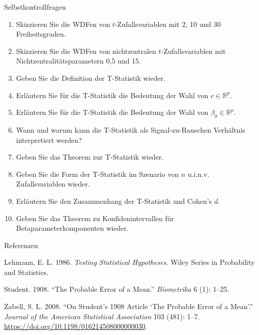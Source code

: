 \documentclass[
  8pt,
  ignorenonframetext,
]{beamer}
\providecommand{\tightlist}{%
  \setlength{\itemsep}{0pt}\setlength{\parskip}{0pt}}
\newlength{\cslhangindent}
\newlength{\cslentryspacingunit} %
\newenvironment{CSLReferences}[2] %
 {%
  \setlength{\parindent}{0pt}
  \ifodd #1
  \let\oldpar\par
  \def\par{\hangindent=\cslhangindent\oldpar}
  \fi
  \setlength{\parskip}{#2\cslentryspacingunit}
 }%
 {}
\begin{document}
\begin{frame}{Selbstkontrollfragen}
\protect\hypertarget{selbstkontrollfragen}{}
\footnotesize
{}

\begin{enumerate}
\tightlist
\item
  Skizzieren Sie die WDFen von \(t\)-Zufallsvariablen mit 2, 10 und 30
  Freiheitsgraden.
\item
  Skizzieren Sie die WDFen von nichtzentralen \(t\)-Zufallsvariablen mit
  Nichtzentralitätsparametern 0,5 und 15.
\item
  Geben Sie die Definition der T-Statistik wieder.
\item
  Erläutern Sie für die T-Statistik die Bedeutung der Wahl von
  \(c \in \mathbb{R}^p\).
\item
  Erläutern Sie für die T-Statistik die Bedeutung der Wahl von
  \(\beta_0 \in \mathbb{R}^p\).
\item
  Wann und warum kann die T-Statistik als Signal-zu-Rauschen Verhältnis
  interpretiert werden?
\item
  Geben Sie das Theorem zur T-Statistik wieder.
\item
  Geben Sie die Form der T-Statistik im Szenario von \(n\) u.i.n.v.
  Zufallsvariablen wieder.
\item
  Erläutern Sie den Zusammenhang der T-Statistik und Cohen's \(d\).
\item
  Geben Sie das Theorem zu Konfidenintervallen für
  Betaparameterkomponenten wieder.
\end{enumerate}
\end{frame}

\begin{frame}{Referenzen}
\protect\hypertarget{referenzen}{}
\footnotesize
{}

\hypertarget{refs}{}
\begin{CSLReferences}{1}{0}
\leavevmode{}%
Lehmann, E. L. 1986. \emph{Testing Statistical Hypotheses}. {Wiley
Series in Probability and Statistics}.

\leavevmode{}%
Student. 1908. {``The {Probable Error} of a {Mean}.''} \emph{Biometrika}
6 (1): 1--25.

\leavevmode{}%
Zabell, S. L. 2008. {``On {Student}'s 1908 {Article} {`{The Probable
Error} of a {Mean}'}.''} \emph{Journal of the American Statistical
Association} 103 (481): 1--7.
\url{https://doi.org/10.1198/016214508000000030}.

\end{CSLReferences}
\end{frame}
\end{document}
